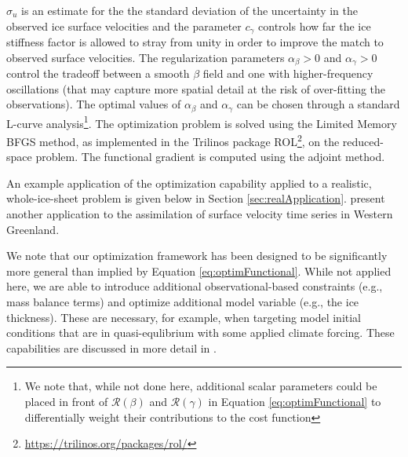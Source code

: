 $\sigma_u$ is an estimate for the the standard deviation of the uncertainty in the observed ice surface velocities and the parameter $c_{\gamma}$ controls how far the ice stiffness factor is allowed to stray from unity in order to improve the match to observed surface velocities. The regularization parameters $\alpha_\beta>0$ and $\alpha_\gamma>0$ control the tradeoff between a smooth $\beta$ field and one with higher-frequency oscillations (that may capture more spatial detail at the risk of over-fitting the observations). The optimal values of $\alpha_\beta$ and $\alpha_\gamma$ can be chosen through a standard L-curve analysis\footnote{We note that, while not done here, additional scalar parameters could be placed in front of $\mathcal R(\beta)$ and $\mathcal R(\gamma)$ in Equation \ref{eq:optimFunctional} to differentially weight their contributions to the cost function}. The optimization problem is solved using the Limited Memory BFGS method, as implemented in the Trilinos package ROL\footnote{\url{https://trilinos.org/packages/rol/}}, on the reduced-space problem. The functional gradient is computed using the adjoint method.

An example application of the optimization capability applied to a realistic, whole-ice-sheet problem is given below in Section \ref{sec:realApplication}. \cite{Hoffman2018GRL} present another application to the assimilation of surface velocity time series in Western Greenland.   

We note that our optimization framework has been designed to be significantly more general than implied by Equation \ref{eq:optimFunctional}. While not applied here, we are able to introduce additional observational-based constraints (e.g., mass balance terms) and optimize additional model variable (e.g., the ice thickness). These are necessary, for example, when targeting model initial conditions that are in quasi-equlibrium with some applied climate forcing. These capabilities are discussed in more detail in \cite{perego2014}.
